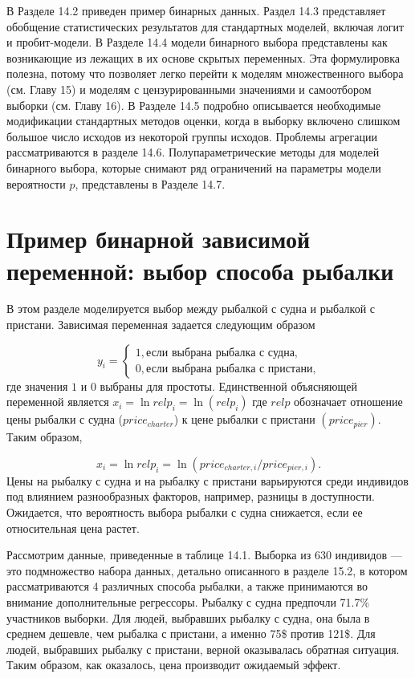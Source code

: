 В Разделе 14.2 приведен пример бинарных данных. Раздел 14.3 представляет обобщение статистических результатов для стандартных моделей,  включая логит и пробит-модели. В Разделе 14.4 модели бинарного выбора представлены как возникающие из лежащих в их основе скрытых переменных. Эта формулировка полезна,  потому что позволяет легко перейти к моделям множественного выбора (см. Главу 15) и моделям с цензурированными значениями и самоотбором выборки  (см. Главу 16). В Разделе 14.5 подробно описывается необходимые модификации стандартных методов оценки,  когда в выборку включено слишком большое число исходов из некоторой группы исходов. Проблемы агрегации рассматриваются в разделе 14.6. Полупараметрические методы для моделей бинарного выбора, которые снимают ряд ограничений на параметры модели вероятности $p$,  представлены в Разделе 14.7.

\section{Пример бинарной зависимой переменной: выбор способа рыбалки}

В этом разделе моделируется выбор между рыбалкой с судна и рыбалкой с пристани. Зависимая переменная задается следующим образом

\[
y_i=
\begin{cases}
1, \text{если выбрана рыбалка с судна,} \\ 
0, \text{если выбрана рыбалка с пристани,}
\end{cases}
\] 
где значения $1$ и $0$ выбраны для простоты. Единственной объясняющей переменной является $x_i=\ln  relp_i= \ln  \left(relp_i\right) $ где $relp$ обозначает отношение цены рыбалки с судна ($price_{charter}$) к цене рыбалки с пристани $(price_{pier})$. Таким образом, 

\[
x_i=\ln  relp_i=\ln  (price_{charter, i}/price_{pier, i}).
\] 
Цены на рыбалку с судна и на рыбалку с пристани варьируются среди индивидов под влиянием разнообразных факторов,  например,  разницы в доступности. Ожидается,  что вероятность выбора рыбалки с судна снижается,  если ее относительная цена растет.

Рассмотрим данные,  приведенные в таблице 14.1. Выборка из 630 индивидов --- это подмножество набора данных,  детально описанного в разделе 15.2,  в котором рассматриваются 4 различных способа рыбалки,  а также принимаются во внимание дополнительные регрессоры. Рыбалку с судна предпочли 71.7\% участников выборки. Для людей,  выбравших рыбалку с судна,  она была в среднем дешевле,  чем рыбалка с пристани,  а именно 75\$ против 121\$. Для людей,  выбравших рыбалку с пристани,  верной оказывалась обратная ситуация. Таким образом,  как оказалось,  цена производит ожидаемый эффект.

